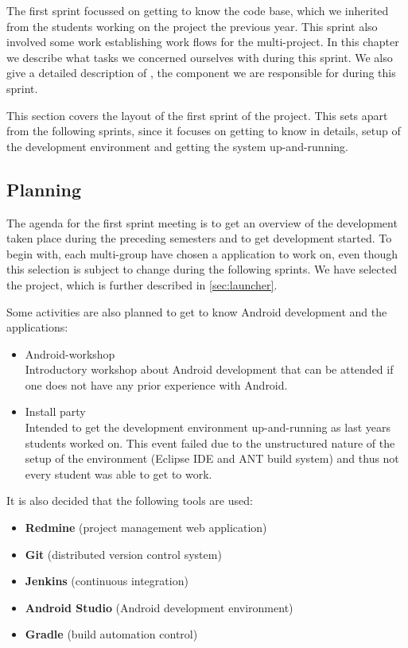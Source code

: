 The first sprint focussed on getting to know the \giraf code base, which we inherited from the students working on the project the previous year. 
This sprint also involved some work establishing work flows for the multi-project. 
In this chapter we describe what tasks we concerned ourselves with during this sprint. 
We also give a detailed description of \launcher, the component we are responsible for during this sprint.

This section covers the layout of the first sprint of the project.
This sets apart from the following sprints, since it focuses on getting to know \giraf in details, setup of the development environment and getting the system up-and-running.

\subsection{Planning}\label{sec:sprint1:planning}
The agenda for the first sprint meeting is to get an overview of the development taken place during the preceding semesters and to get development started.
To begin with, each multi-group have chosen a \giraf application to work on, even though this selection is subject to change during the following sprints.
We have selected the \launcher project, which is further described in \cref{sec:launcher}.

Some activities are also planned to get to know Android development and the \giraf applications:

\begin{itemize}
\item Android-workshop\\
Introductory workshop about Android development that can be attended if one does not have any prior experience with Android.
\item Install party\\
Intended to get the \giraf development environment up-and-running as last years students worked on. 
This event failed due to the unstructured nature of the setup of the environment (Eclipse IDE and ANT build system) and thus not every student was able to get \giraf to work.
\end{itemize}

It is also decided that the following tools are used:

\begin{itemize}
\item \textbf{Redmine} (project management web application)
\item \textbf{Git} (distributed version control system)
\item \textbf{Jenkins} (continuous integration)
\item \textbf{Android Studio} (Android development environment)
\item \textbf{Gradle} (build automation control)
\end{itemize}

